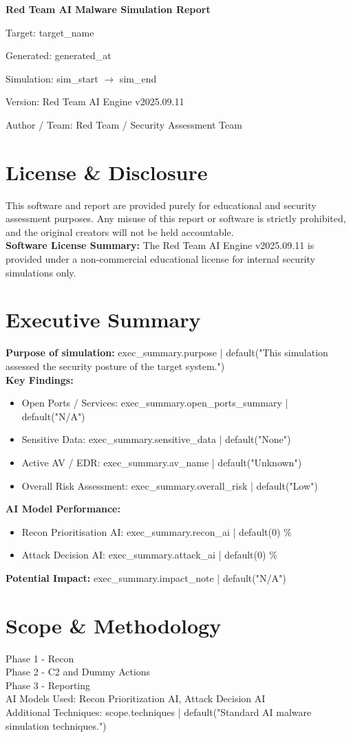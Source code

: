 \documentclass[a4paper,12pt]{article}
\newcommand{\coverpage}{
    \thispagestyle{empty}
    \begin{titlepage}
        \pagecolor{coverred}
        \color{white}
        \centering
        \vspace*{5cm}
        {\Huge \textbf{Red Team AI Malware Simulation Report} \par}
        \vspace{1cm}
        {\Large Target: {{ target_name }} \par}
        \vspace{0.5cm}
        {\large Generated: {{ generated_at }} \par}
        Simulation: {{ sim_start }} $\rightarrow$ {{ sim_end }} \par
        Version: Red Team AI Engine v2025.09.11 \par
        \vspace{1cm}
        Author / Team: Red Team / Security Assessment Team \par
        \vfill
    \end{titlepage}
    \pagecolor{offwhite}  %
    \color{black}          %
}
\newcommand{\licensepage}{
    \thispagestyle{empty}
    \section*{License \& Disclosure}
    This software and report are provided purely for educational and security assessment purposes. 
    Any misuse of this report or software is strictly prohibited, and the original creators 
    will not be held accountable. \\
    \vspace{0.5cm}
    \textbf{Software License Summary:} The Red Team AI Engine v2025.09.11 is provided under 
    a non-commercial educational license for internal security simulations only.
    \newpage
}
\begin{document}
\coverpage

\licensepage

\section*{Executive Summary}
\textbf{Purpose of simulation:} {{ exec_summary.purpose | default("This simulation assessed the security posture of the target system.") }} \\
\textbf{Key Findings:}
\begin{itemize}
    \item Open Ports / Services: {{ exec_summary.open_ports_summary | default("N/A") }}
    \item Sensitive Data: {{ exec_summary.sensitive_data | default("None") }}
    \item Active AV / EDR: {{ exec_summary.av_name | default("Unknown") }}
    \item Overall Risk Assessment: {{ exec_summary.overall_risk | default("Low") }}
\end{itemize}

\textbf{AI Model Performance:}
\begin{itemize}
    \item Recon Prioritisation AI: {{ exec_summary.recon_ai | default(0) }}\%
    \item Attack Decision AI: {{ exec_summary.attack_ai | default(0) }}\%
\end{itemize}

\textbf{Potential Impact:} {{ exec_summary.impact_note | default("N/A") }}
\newpage

\section*{Scope \& Methodology}
Phase 1 - Recon \\
Phase 2 - C2 and Dummy Actions \\
Phase 3 - Reporting \\
AI Models Used: Recon Prioritization AI, Attack Decision AI \\
Additional Techniques: {{ scope.techniques | default("Standard AI malware simulation techniques.") }}
\newpage

\end{document}
